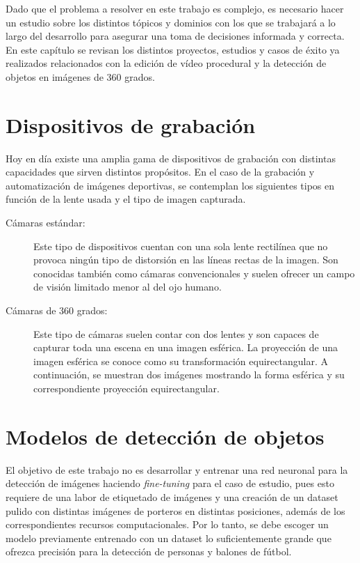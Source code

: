 Dado que el problema a resolver en este trabajo es complejo, es necesario hacer un estudio sobre los distintos tópicos y dominios con los que se trabajará a lo largo del desarrollo para asegurar una toma de decisiones informada y correcta. En este capítulo se revisan los distintos proyectos, estudios y casos de éxito ya realizados relacionados con la edición de vídeo procedural y la detección de objetos en imágenes de 360 grados.

\section[Dispositivos de grabación]{Dispositivos de grabación}
Hoy en día existe una amplia gama de dispositivos de grabación con distintas capacidades que sirven distintos propósitos. En el caso de la grabación y automatización de imágenes deportivas, se contemplan los siguientes tipos en función de la lente usada y el tipo de imagen capturada.
\begin{description}
	\item [Cámaras estándar:] Este tipo de dispositivos cuentan con una sola lente rectilínea que no provoca ningún tipo de distorsión en las líneas rectas de la imagen. Son conocidas también como cámaras convencionales y suelen ofrecer un campo de visión limitado menor al del ojo humano.
	\item [Cámaras de 360 grados:] Este tipo de cámaras suelen contar con dos lentes y son capaces de capturar toda una escena en una imagen esférica. La proyección de una imagen esférica se conoce como su transformación equirectangular. A continuación, se muestran dos imágenes mostrando la forma esférica y su correspondiente proyección equirectangular.
\end{description}

\section[Detección de objetos]{Modelos de detección de objetos}
El objetivo de este trabajo no es desarrollar y entrenar una red neuronal para la detección de imágenes haciendo \textit{fine-tuning} para el caso de estudio, pues esto requiere de una labor de etiquetado de imágenes y una creación de un dataset pulido con distintas imágenes de porteros en distintas posiciones, además de los correspondientes recursos computacionales. Por lo tanto, se debe escoger un modelo previamente entrenado con un dataset lo suficientemente grande que ofrezca precisión para la detección de personas y balones de fútbol.

